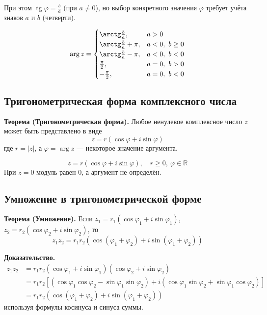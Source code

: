 \documentclass[a4paper,12pt]{article}
\theoremstyle{definition}
\theoremstyle{plain}
\theoremstyle{remark}
\begin{document}
	При этом $\operatorname{tg} \varphi = \frac{b}{a}$ (при $a \neq 0$), но выбор конкретного значения $\varphi$ требует учёта знаков $a$ и $b$ (четверти).
	
	\begin{tcolorbox}[colback=green!5, colframe=green!50!black, title=Нахождение аргумента]
		\[
		\arg z = 
		\begin{cases}
			\arctg\frac{b}{a}, & a > 0 \\
			\arctg\frac{b}{a} + \pi, & a < 0,\ b \geq 0 \\
			\arctg\frac{b}{a} - \pi, & a < 0,\ b < 0 \\
			\frac{\pi}{2}, & a = 0,\ b > 0 \\
			-\frac{\pi}{2}, & a = 0,\ b < 0
		\end{cases}
		\]
	\end{tcolorbox}
	
	\subsection{Тригонометрическая форма комплексного числа}
	
	\noindent \textbf{Теорема (Тригонометрическая форма).}
	Любое ненулевое комплексное число $z$ может быть представлено в виде
	\[
	z = r(\cos \varphi + i \sin \varphi)
	\]
	где $r = |z|$, а $\varphi = \arg z$ — некоторое значение аргумента.
	
	\begin{tcolorbox}[colback=red!5, colframe=red!70!black, title=Тригонометрическая форма]
		\[
		\boxed{z = r(\cos \varphi + i \sin \varphi),\quad r \geq 0,\ \varphi \in \mathbb{R}}
		\]
		При $z = 0$ модуль равен $0$, а аргумент не определён.
	\end{tcolorbox}
	
	\subsection{Умножение в тригонометрической форме}
	
	\noindent \textbf{Теорема (Умножение).}
	Если $z_1 = r_1(\cos \varphi_1 + i \sin \varphi_1)$, $z_2 = r_2(\cos \varphi_2 + i \sin \varphi_2)$, то
	\[
	z_1 z_2 = r_1 r_2 (\cos(\varphi_1 + \varphi_2) + i \sin(\varphi_1 + \varphi_2))
	\]
	
	\medskip
	\noindent \textbf{Доказательство.}
	\[
	\begin{aligned}
		z_1 z_2 &= r_1 r_2 (\cos \varphi_1 + i \sin \varphi_1)(\cos \varphi_2 + i \sin \varphi_2) \\
		&= r_1 r_2 [(\cos \varphi_1 \cos \varphi_2 - \sin \varphi_1 \sin \varphi_2) + i(\cos \varphi_1 \sin \varphi_2 + \sin \varphi_1 \cos \varphi_2)] \\
		&= r_1 r_2 (\cos(\varphi_1 + \varphi_2) + i \sin(\varphi_1 + \varphi_2))
	\end{aligned}
	\]
	используя формулы косинуса и синуса суммы.
	
\end{document}
